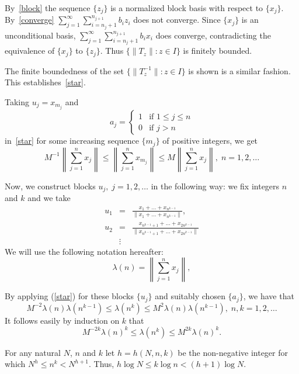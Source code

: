 \documentclass[12pt]{report}
\begin{document}
By~\eqref{block} the sequence $\{z_j\}$ is a normalized block basis with respect to $\{x_j\}$.
By~\eqref{converge} $\sum_{j=1}^\infty \sum_{i=n_j +1}^{n_{j+1}} b_i z_i$ does not converge.
Since $\{x_j\}$ is an unconditional basis,
$\sum_{j=1}^\infty \sum_{i=n_j +1}^{n_{j+1}} b_i x_i$ does converge, contradicting the
equivalence of $\{x_j\}$ to $\{z_j\}$.  Thus $\{\|T_z\| : z\in I\}$ is finitely bounded.

The finite boundedness of the set $\{\|T^{-1}_z\| : z\in I\}$ is shown is a similar fashion.
This establishes~\eqref{star}.

Taking $u_j = x_{m_j}$ and
\begin{equation*}
a_j =
\begin{cases}
1 & \text{if $1\leq j \leq n$} \\
0 & \text{if $j>n$}
\end{cases}
\end{equation*}
in~\eqref{star} for some increasing sequence $\{m_j\}$ of positive integers, we get
\begin{equation}\label{star-star}
M^{-1}\left\|\sum_{j=1}^n x_j\right\| \leq \left\|\sum_{j=1}^n x_{m_j}\right\|
\leq M\left\|\sum_{j=1}^n x_j\right\|,\;n=1,2,\ldots
\end{equation}


Now, we construct blocks $u_j,\;j=1,2,\ldots$ in the following way: we fix integers $n$ and $k$ and we 
take
\begin{eqnarray*}
u_1 & = & \frac{x_1 + \ldots + x_{n^{k-1}}}{\|x_1 + \ldots + x_{n^{k-1}}\|}, \\
u_2 & = & \frac{x_{n^{k-1}+1} + \ldots + x_{2n^{k-1}}}{\|x_{n^{k-1}+1} + \ldots + x_{2n^{k-1}}\|}\\
    &\vdots
\end{eqnarray*}
We will use the following notation hereafter:
$$
\lambda(n) = \left\|\sum_{j=1}^n x_j \right\|,
$$

By applying (\ref{star}) for these blocks $\{u_j\}$ and suitably chosen $\{a_j\}$, we have that
$$
M^{-2}\lambda(n)\lambda(n^{k-1}) \leq \lambda(n^k) \leq M^2 \lambda(n)\lambda(n^{k-1}),\;n,k=1,2,\ldots
$$
It follows easily by induction on $k$ that
\begin{equation}\label{lambda}
M^{-2k} \lambda(n)^k \leq \lambda(n^k) \leq M^{2k}\lambda(n)^k.
\end{equation}

For any natural $N$, $n$ and $k$ let $h = h(N,n,k)$ be the non-negative integer for which
$N^h \leq n^k < N^{h+1}$.  Thus, $h\log N \leq k\log n < (h+1)\log N$.
\end{document}
